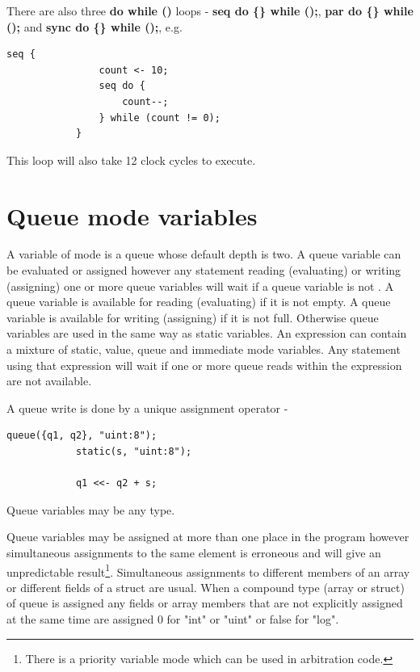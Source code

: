        There are also three {\bf do while ()} loops -
        {\bf seq do \{\} while ();}, {\bf par do \{\} while ();} and
        {\bf sync do \{\} while ();}, e.g.
        \begin{lstlisting}[language=threepl]
            seq {
                count <- 10;
                seq do {
                    count--;
                } while (count != 0);
            }
        \end{lstlisting}
        This loop will also take 12 clock cycles to execute.




    \section{Queue mode variables}

        A variable of mode  is a queue whose default depth is two. A
        queue variable can be evaluated or assigned however any statement reading
        (evaluating) or writing (assigning) one or more queue variables will wait if
        a queue variable is not . A queue variable is available for
        reading (evaluating) if it is not empty. A queue variable is available for
        writing (assigning) if it is not full. Otherwise queue variables are used in
        the same way as static variables. An expression can contain a mixture of
        static, value, queue and immediate mode variables. Any statement using that
        expression will wait if one or more queue reads within the expression are
        not available.

        A queue write is done by a unique assignment operator -
        \begin{lstlisting}[language=threepl]
            queue({q1, q2}, "uint:8");
            static(s, "uint:8");

            q1 <<- q2 + s;
        \end{lstlisting}

        Queue variables may be any type.

        Queue variables may be assigned at more than one place in the program
        however simultaneous assignments to the same element is erroneous and will
        give an unpredictable result\footnote{There is a priority variable mode
        which can be used in arbitration code.}.
        Simultaneous assignments to different members
        of an array or different fields of a struct are usual. When a compound type
        (array or struct) of queue is assigned any fields or array members that are
        not explicitly assigned at the same time are assigned 0 for "int" or "uint"
        or false for "log".

